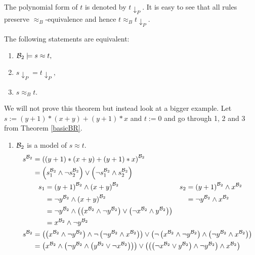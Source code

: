 	The polynomial form of $t$ is denoted by $t{\downarrow_P}$. It is easy to see that all rules preserve $\approx_B$-equivalence and hence $t\approx_Bt{\downarrow_P}$.
	\begin{theorem}\label{basicBR}
		The following statements are equivalent:
		\begin{enumerate}
			\item ${\mathcal{B}_2}\models s\approx t,$
			\item $s{\downarrow_P}=t{\downarrow_P},$
			\item $s\approx_B t.$
		\end{enumerate}
	\end{theorem}
	We will not prove this theorem but instead look at a bigger example. Let $s:=(y+1)*(x+y)+(y+1)*x$ and $t:=0$ and go through 1, 2 and 3 from Theorem \ref{basicBR}.
	\begin{enumerate}
			\item ${\mathcal{B}_2}$ is a model of $s\approx t$.
			\begin{align*}
				s^\BTwo & =\left( \left( y+1\right)*\left( x+y\right)+\left( y+1\right)*x\right)^\BTwo       \\
				& =\left( s_1^\BTwo\wedge \neg s_2^\BTwo\right)\vee\left( \neg s_1^\BTwo\wedge s_2^\BTwo\right) \\
				&\hspace{8pt}\begin{aligned}
				s_1 & =\left( y+1\right)^\BTwo\wedge\left( x+y\right)^\BTwo & s_2 & =   \left( y+1\right)^\BTwo\wedge x^\BTwo \\
				    & =\neg y^\BTwo\wedge\left( x+y\right)^\BTwo            &     & = \neg y^\BTwo\wedge x^\BTwo              \\
				&=\neg y^\BTwo\wedge\left( \left( x^\BTwo\wedge\neg y^\BTwo\right)\vee\left( \neg x^\BTwo\wedge y^\BTwo\right)\right)\\
				& = x^\BTwo\wedge\neg y^\BTwo
				\end{aligned}\\
				s^\BTwo & =\left( \left( x^\BTwo\wedge\neg y^\BTwo\right)\wedge \neg \left( \neg y^\BTwo\wedge x^\BTwo\right)\right)\vee\left( \neg\left( x^\BTwo\wedge\neg y^\BTwo\right)\wedge \left( \neg y^\BTwo\wedge x^\BTwo\right)\right) \\
				& =\left( x^\BTwo\wedge\left( \neg y^\BTwo\wedge \left( y^\BTwo\vee\neg x^\BTwo\right)\right)\right)\vee\left( \left( \left( \neg x^\BTwo\vee y^\BTwo\right)\wedge \neg y^\BTwo\right)\wedge x^\BTwo\right)              \\

\end{align*}
\end{enumerate}
